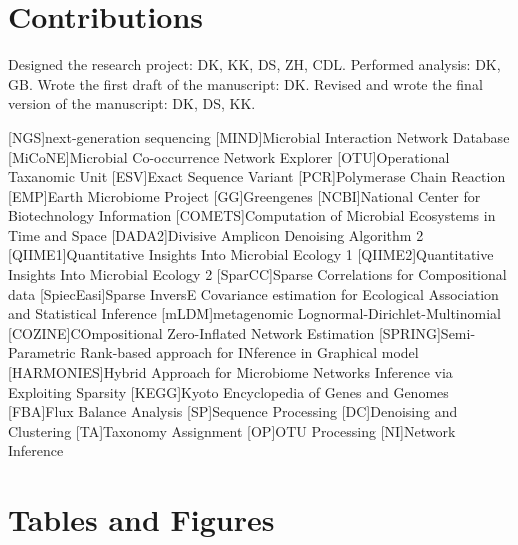 \documentclass[letterpaper,12pt]{article}
\begin{document}
\section*{Contributions}
Designed the research project: DK, KK, DS, ZH, CDL. Performed analysis: DK, GB. Wrote the first draft of the manuscript: DK. Revised and wrote the final version of the manuscript: DK, DS, KK.

\newpage
\singlespacing
\printbibliography


\begin{acronym}[XXXXXXXX]
    [NGS]{next-generation sequencing}
    [MIND]{Microbial Interaction Network Database}
    [MiCoNE]{Microbial Co-occurrence Network Explorer}
    [OTU]{Operational Taxanomic Unit}
    [ESV]{Exact Sequence Variant}
    [PCR]{Polymerase Chain Reaction}
    [EMP]{Earth Microbiome Project}
    [GG]{Greengenes}
    [NCBI]{National Center for Biotechnology Information}
    [COMETS]{Computation of Microbial Ecosystems in Time and Space}
    [DADA2]{Divisive Amplicon Denoising Algorithm 2}
    [QIIME1]{Quantitative Insights Into Microbial Ecology 1}
    [QIIME2]{Quantitative Insights Into Microbial Ecology 2}
    [SparCC]{Sparse Correlations for Compositional data}
    [SpiecEasi]{Sparse InversE Covariance estimation for Ecological Association and Statistical Inference}
    [mLDM]{metagenomic Lognormal-Dirichlet-Multinomial}
    [COZINE]{COmpositional Zero-Inflated Network Estimation}
    [SPRING]{Semi-Parametric Rank-based approach for INference in Graphical model}
    [HARMONIES]{Hybrid Approach for Microbiome Networks Inference via Exploiting Sparsity}
    [KEGG]{Kyoto Encyclopedia of Genes and Genomes}
    [FBA]{Flux Balance Analysis}
    [SP]{Sequence Processing}
    [DC]{Denoising and Clustering}
    [TA]{Taxonomy Assignment}
    [OP]{OTU Processing}
    [NI]{Network Inference}
\end{acronym}

\newpage
\section*{Tables and Figures}
\end{document}
